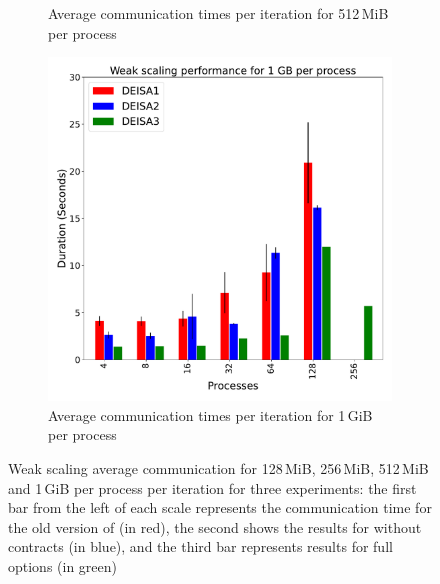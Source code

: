 \begin{figure}
\begin{subfigure}[b]{0.4\textwidth}
         \caption{Average communication times per iteration for 512\,MiB per process}
         \label{fig:X2_512}
     \end{subfigure}
     \hfill
     \begin{subfigure}[b]{0.4\textwidth}
         \centering
         \includegraphics[width=\textwidth, height=\textwidth]{figures/1GB_1vs2vs3.pdf}
         \caption{Average communication times per iteration for 1\,GiB per process}
         \label{fig:X2_1}
     \end{subfigure}
        \caption{Weak scaling average communication for 128\,MiB, 256\,MiB, 512\,MiB  and 1\,GiB per process per iteration for three experiments: the first bar from the left of each scale represents the communication time for the old version of \deisa (in red), the second shows the results for \deisa without contracts (in blue), and the third bar represents results for \deisa full options (in green)}
        \label{fig:perfX2}
\end{figure}


